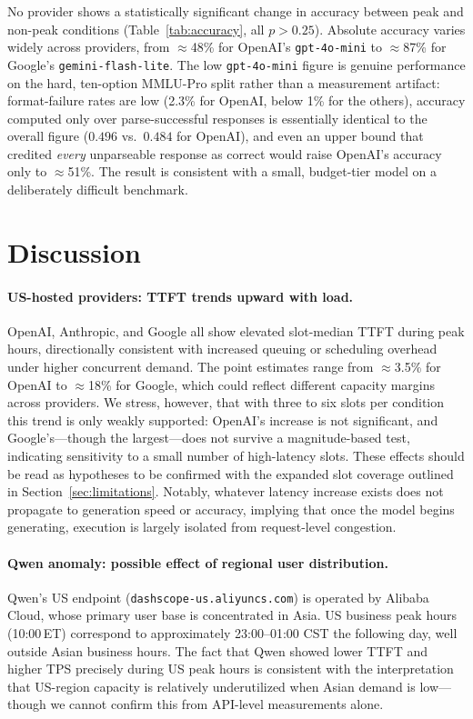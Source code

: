 \documentclass[11pt]{article}
\begin{document}
No provider shows a statistically significant change in accuracy between peak and non-peak
conditions (Table~\ref{tab:accuracy}, all $p > 0.25$).
Absolute accuracy varies widely across providers, from $\approx$48\% for OpenAI's
\texttt{gpt-4o-mini} to $\approx$87\% for Google's \texttt{gemini-flash-lite}.
The low \texttt{gpt-4o-mini} figure is genuine performance on the hard, ten-option MMLU-Pro
split rather than a measurement artifact: format-failure rates are low (2.3\% for OpenAI,
below 1\% for the others), accuracy computed only over parse-successful responses is
essentially identical to the overall figure ($0.496$ vs.\ $0.484$ for OpenAI), and even an
upper bound that credited \emph{every} unparseable response as correct would raise OpenAI's
accuracy only to $\approx$51\%. The result is consistent with a small, budget-tier model on
a deliberately difficult benchmark.

\section{Discussion}
\label{sec:discussion}

\paragraph{US-hosted providers: TTFT trends upward with load.}
OpenAI, Anthropic, and Google all show elevated slot-median TTFT during peak hours,
directionally consistent with increased queuing or scheduling overhead under higher
concurrent demand.
The point estimates range from $\approx$3.5\% for OpenAI to $\approx$18\% for Google,
which could reflect different capacity margins across providers.
We stress, however, that with three to six slots per condition this trend is only weakly
supported: OpenAI's increase is not significant, and Google's---though the largest---does
not survive a magnitude-based test, indicating sensitivity to a small number of
high-latency slots. These effects should be read as hypotheses to be confirmed with the
expanded slot coverage outlined in Section~\ref{sec:limitations}.
Notably, whatever latency increase exists does not propagate to generation speed or
accuracy, implying that once the model begins generating, execution is largely isolated
from request-level congestion.

\paragraph{Qwen anomaly: possible effect of regional user distribution.}
Qwen's US endpoint (\texttt{dashscope-us.aliyuncs.com}) is operated by Alibaba Cloud,
whose primary user base is concentrated in Asia.
US business peak hours (10:00\,ET) correspond to approximately 23:00--01:00 CST the
following day, well outside Asian business hours.
The fact that Qwen showed lower TTFT and higher TPS precisely during US peak hours is
consistent with the interpretation that US-region capacity is relatively underutilized when
Asian demand is low---though we cannot confirm this from API-level measurements alone.
\end{document}
